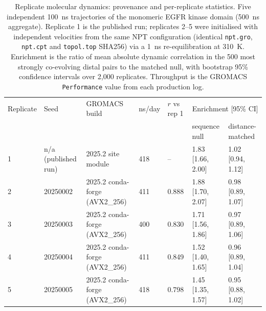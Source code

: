 \begin{table}[htbp]
\caption{Replicate molecular dynamics: provenance and per-replicate statistics. Five independent 100~ns trajectories of the monomeric EGFR kinase domain (500~ns aggregate). Replicate 1 is the published run; replicates 2--5 were initialised with independent velocities from the same NPT configuration (identical \texttt{npt.gro}, \texttt{npt.cpt} and \texttt{topol.top} SHA256) via a 1~ns re-equilibration at 310~K. Enrichment is the ratio of mean absolute dynamic correlation in the 500 most strongly co-evolving distal pairs to the matched null, with bootstrap 95\% confidence intervals over 2{,}000 replicates. Throughput is the GROMACS \texttt{Performance} value from each production log.}
\label{tab:replicates}
\begin{tabular}{lllllll}
\hline
Replicate & Seed & GROMACS build & ns/day & $r$ vs rep 1 & \multicolumn{2}{c}{Enrichment [95\% CI]} \\
 & & & & & sequence null & distance-matched \\
\hline
  1 & n/a (published run) & 2025.2 site module & 418 & -- & 1.83 [1.66, 2.00] & 1.02 [0.94, 1.12] \\
  2 & 20250002 & 2025.2 conda-forge (AVX2\_256) & 411 & 0.888 & 1.88 [1.70, 2.07] & 0.98 [0.89, 1.07] \\
  3 & 20250003 & 2025.2 conda-forge (AVX2\_256) & 400 & 0.830 & 1.71 [1.56, 1.86] & 0.97 [0.89, 1.06] \\
  4 & 20250004 & 2025.2 conda-forge (AVX2\_256) & 411 & 0.849 & 1.52 [1.40, 1.65] & 0.96 [0.89, 1.04] \\
  5 & 20250005 & 2025.2 conda-forge (AVX2\_256) & 418 & 0.798 & 1.45 [1.35, 1.57] & 0.95 [0.88, 1.02] \\
\hline
\end{tabular}
\end{table}

